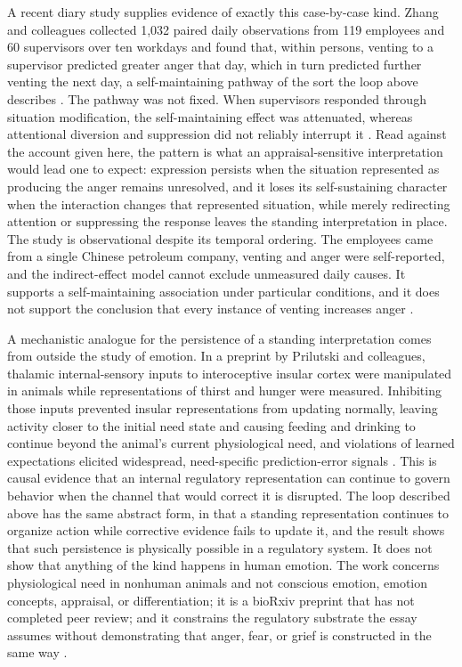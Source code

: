 \documentclass[11pt]{article}
\begin{document}
A recent diary study supplies evidence of exactly this case-by-case kind. Zhang and colleagues collected 1,032 paired daily observations from 119 employees and 60 supervisors over ten workdays and found that, within persons, venting to a supervisor predicted greater anger that day, which in turn predicted further venting the next day, a self-maintaining pathway of the sort the loop above describes \citep{Zhang2026}. The pathway was not fixed. When supervisors responded through situation modification, the self-maintaining effect was attenuated, whereas attentional diversion and suppression did not reliably interrupt it \citep{Zhang2026}. Read against the account given here, the pattern is what an appraisal-sensitive interpretation would lead one to expect: expression persists when the situation represented as producing the anger remains unresolved, and it loses its self-sustaining character when the interaction changes that represented situation, while merely redirecting attention or suppressing the response leaves the standing interpretation in place. The study is observational despite its temporal ordering. The employees came from a single Chinese petroleum company, venting and anger were self-reported, and the indirect-effect model cannot exclude unmeasured daily causes. It supports a self-maintaining association under particular conditions, and it does not support the conclusion that every instance of venting increases anger \citep{Zhang2026}.

A mechanistic analogue for the persistence of a standing interpretation comes from outside the study of emotion. In a preprint by Prilutski and colleagues, thalamic internal-sensory inputs to interoceptive insular cortex were manipulated in animals while representations of thirst and hunger were measured. Inhibiting those inputs prevented insular representations from updating normally, leaving activity closer to the initial need state and causing feeding and drinking to continue beyond the animal's current physiological need, and violations of learned expectations elicited widespread, need-specific prediction-error signals \citep{Prilutski2026}. This is causal evidence that an internal regulatory representation can continue to govern behavior when the channel that would correct it is disrupted. The loop described above has the same abstract form, in that a standing representation continues to organize action while corrective evidence fails to update it, and the result shows that such persistence is physically possible in a regulatory system. It does not show that anything of the kind happens in human emotion. The work concerns physiological need in nonhuman animals and not conscious emotion, emotion concepts, appraisal, or differentiation; it is a bioRxiv preprint that has not completed peer review; and it constrains the regulatory substrate the essay assumes without demonstrating that anger, fear, or grief is constructed in the same way \citep{Prilutski2026}.
\end{document}
